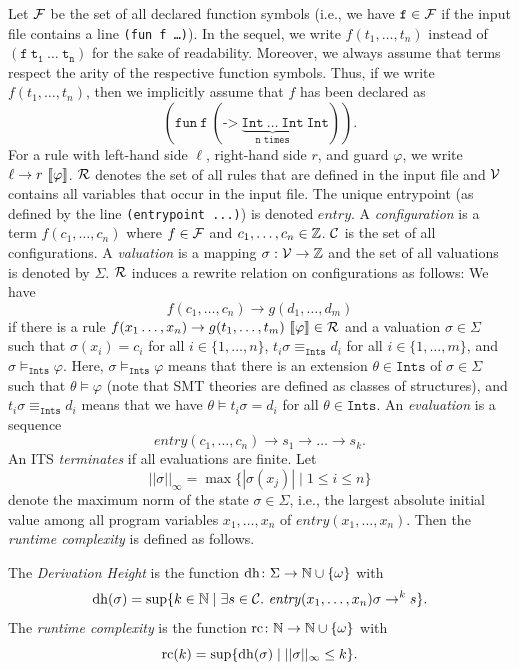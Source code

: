 Let $\mathcal{F}$ be the set of all declared function symbols (i.e., we have $\mathtt{f} \in \mathcal{F}$ if the input file contains a line \texttt{(fun f \ldots)}).
%
In the sequel, we write $f(t_1,\ldots,t_n)$ instead of $\mathtt{(f\ t_1\ \ldots\ t_n)}$ for the sake of readability.
%
Moreover, we always assume that terms respect the arity of the respective function symbols.
%
Thus, if we write $f(t_1,\ldots,t_n)$, then we implicitly assume that $f$ has been declared as $$\mathtt{(fun\ f\ (\texttt{->}\ \underbrace{\mathtt{Int\ \ldots\ Int}}_{n \text{ times}}\ Int))}.$$
%
For a rule with left-hand side $\ell$, right-hand side $r$, and guard $\varphi$, we write $\ell \to r\ \llbracket \varphi \rrbracket$.
%
$\mathcal{R}$ denotes the set of all rules that are defined in the input file and $\mathcal{V}$ contains all variables that occur in the input file.
%
The unique entrypoint (as defined by the line \texttt{(entrypoint ...)}) is denoted $\mathit{entry}$.
%
A \emph{configuration} is a term $f(c_1,\ldots,c_n)$ where $f \in \mathcal{F}$ and $c_1,\ldots,c_n \in \mathbb{Z}$.
%
$\mathcal{C}$ is the set of all configurations.
%
A \emph{valuation} is a mapping $\sigma: \mathcal{V} \to \mathbb{Z}$ and the set of all valuations is denoted by $\Sigma$.
%
$\mathcal{R}$ induces a rewrite relation on configurations as follows:
%
We have
\[
  f(c_1,\ldots,c_n) \to g(d_1,\ldots,d_m)
\]
if there is a rule $f(x_1\ldots,x_n) \to g(t_1,\ldots,t_m)\ \llbracket \varphi \rrbracket \in \mathcal{R}$ and a valuation $\sigma\in\Sigma$ such that $\sigma(x_i) = c_i$ for all $i \in \{1, \ldots, n\}$, $t_i\sigma \equiv_{\mathtt{Ints}} d_i$ for all $i \in \{1, \ldots, m\}$, and $\sigma \models_{\mathtt{Ints}} \varphi$.
%
Here, $\sigma \models_{\mathtt{Ints}} \varphi$ means that there is an extension $\theta \in \mathtt{Ints}$ of $\sigma\in\Sigma$ such that $\theta \models \varphi$ (note that SMT theories are defined as classes of structures), and $t_i\sigma \equiv_{\mathtt{Ints}} d_i$ means that we have $\theta \models t_i\sigma = d_i$ for all $\theta \in \mathtt{Ints}$.
%
An \emph{evaluation} is a sequence
\[
  \mathit{entry}(c_1,\ldots,c_n) \to s_1 \to \ldots \to s_k.
\]
%
An ITS \emph{terminates} if all evaluations are finite.
%
Let
\[
  ||\sigma||_{\infty} = \max \{ |\sigma(x_j)| \mid 1 \leq i \leq n \}
\]
denote the maximum norm of the state $\sigma\in\Sigma$, i.e., the largest absolute initial value among all program variables $x_1,\dots,x_n$ of $\mathit{entry}(x_1,\ldots,x_n)$.
%
Then the \emph{runtime complexity} is defined as follows.
%
\begin{definition}
  The \emph{Derivation Height} is the function $\operatorname{dh}\colon\Sigma\rightarrow\mathbb{N} \cup \{\omega\}$ with
  \[
    \operatorname{dh}(\sigma) = \sup \{k \in \mathbb{N} \mid \exists s \in \mathcal{C}.\ \mathit{entry}(x_1, \ldots, x_n)\sigma \rightarrow^k s \}.
  \]
  The \emph{runtime complexity} is the function $\operatorname{rc}\colon\mathbb{N}\rightarrow\mathbb{N} \cup \{\omega\}$ with
  \[
    \operatorname{rc}(k) = \sup \{\operatorname{dh}(\sigma) \mid ||\sigma||_{\infty} \leq k\}.
  \]
\end{definition}
%
\noindent
%
%
